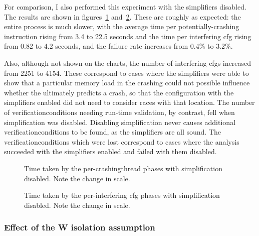 For comparison, I also performed this experiment with the
{\StateMachine} simplifiers disabled.  The results are shown in
figures~\ref{fig:eval:time_breakdown:crashing_no_simple}
and~\ref{fig:eval:time_breakdown:interfering_no_simple}.  These are
roughly as expected: the entire process is much slower, with the
average time per potentially-crashing instruction rising from 3.4 to
22.5 seconds and the time per interfering \gls{cfg} rising from 0.82
to 4.2 seconds, and the failure rate increases from 0.4\% to 3.2\%.

Also, although not shown on the charts, the number of interfering
\glspl{cfg} increased from 2251 to 4154.  These correspond to cases
where the simplifiers were able to show that a particular memory load
in the crashing {\StateMachine} could not possible influence whether
the {\StateMachine} ultimately predicts a crash, so that the
configuration with the simplifiers enabled did not need to consider
races with that location.  The number of \glspl{verificationcondition}
needing run-time validation, by contrast, fell when simplification was
disabled.  Disabling simplification never causes additional
\glspl{verificationcondition} to be found, as the simplifiers are all
sound.  The \glspl{verificationcondition} which were lost correspond
to cases where the analysis succeeded with the simplifiers enabled and
failed with them disabled.

\begin{figure}
  
  \caption{Time taken by the per-\gls{crashingthread} phases with
    {\StateMachine} simplification disabled.  Note the change in
    scale.}
  \label{fig:eval:time_breakdown:crashing_no_simple}
\end{figure}

\begin{figure}
  
  \caption{Time taken by the per-interfering \gls{cfg} phases with
    {\StateMachine} simplification disabled.  Note the change in
    scale.}
  \label{fig:eval:time_breakdown:interfering_no_simple}
\end{figure}

\subsubsection{Effect of the W isolation assumption}
\label{sect:eval:w_isolation}


